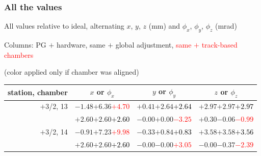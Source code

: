 \documentclass[compress]{beamer}
\begin{document}
\begin{frame}
\frametitle{All the values}
\tiny

All values relative to ideal, alternating $x$, $y$, $z$ (mm) and $\phi_x$, $\phi_y$, $\phi_z$ (mrad)

Columns: PG $+$ hardware, same $+$ global adjustment, \textcolor{red}{same $+$ track-based chambers}

\hfill (color applied only if chamber was aligned)

\vfill
\renewcommand{\arraystretch}{1.1}
\begin{tabular}{r | c | c | c}
station, chamber & $x$ or $\phi_x$ & $y$ or $\phi_y$ & $z$ or $\phi_z$ \\\hline
$+$3/2, 13 & $-1.48$\hspace{0.1 cm}$+6.36$\hspace{0.1 cm}\textcolor{red}{$+4.70$} & $+0.41$\hspace{0.1 cm}$+2.64$\hspace{0.1 cm}\textcolor{black}{$+2.64$} & $+2.97$\hspace{0.1 cm}$+2.97$\hspace{0.1 cm}\textcolor{black}{$+2.97$} \\
           & $+2.60$\hspace{0.1 cm}$+2.60$\hspace{0.1 cm}\textcolor{black}{$+2.60$} & $-0.00$\hspace{0.1 cm}$+0.00$\hspace{0.1 cm}\textcolor{red}{$-3.25$} & $+0.30$\hspace{0.1 cm}$-0.06$\hspace{0.1 cm}\textcolor{red}{$-0.99$} \\
$+$3/2, 14 & $-0.91$\hspace{0.1 cm}$+7.23$\hspace{0.1 cm}\textcolor{red}{$+9.98$} & $-0.33$\hspace{0.1 cm}$+0.84$\hspace{0.1 cm}\textcolor{black}{$+0.83$} & $+3.58$\hspace{0.1 cm}$+3.58$\hspace{0.1 cm}\textcolor{black}{$+3.56$} \\
           & $+2.60$\hspace{0.1 cm}$+2.60$\hspace{0.1 cm}\textcolor{black}{$+2.60$} & $-0.00$\hspace{0.1 cm}$-0.00$\hspace{0.1 cm}\textcolor{red}{$+3.05$} & $-0.00$\hspace{0.1 cm}$-0.37$\hspace{0.1 cm}\textcolor{red}{$-2.39$} \\

\end{tabular}
\end{frame}
\end{document}
